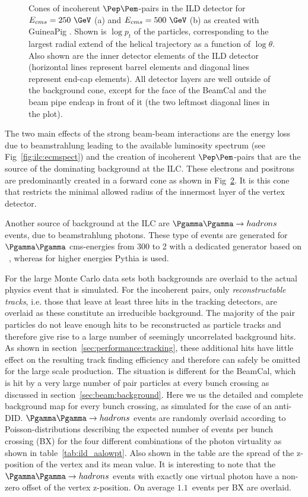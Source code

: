 \begin{figure}[h!]
\begin{subfigure}{0.49\hsize}
    \caption{ \label{fig:pair_bg_cone_500}}
  \end{subfigure}
\caption{\label{fig:pair_bg_cone} Cones of incoherent $\Pep\Pem$-pairs in the ILD detector for $E_{cms}=250~\GeV$ (a) and $E_{cms}=500~\GeV$ (b)
  as created with GuineaPig . Shown is $\log{p_t}$ of the particles,
  corresponding to the largest radial extend of the helical trajectory as a function of $\log{\theta}$.
  Also shown are the inner detector elements of the ILD detector (horizontal lines represent
  barrel elements and diagonal lines represent end-cap elements). All detector layers are well outside of the background cone,
  except for the face of the BeamCal and the beam pipe endcap in front of it (the two leftmost diagonal lines in the plot).}
\end{figure}
The two main effects of the strong beam-beam interactions are the energy loss due to
beamstrahlung leading to the available luminosity spectrum (see Fig~\ref{fig:ilc:ecmspect}) and the creation of
incoherent $\Pep\Pem$-pairs that are the source of the dominating background at the ILC.
These electrons and positrons are predominantly created in a forward cone as shown in Fig~\ref{fig:pair_bg_cone}.
It is this cone that restricts the minimal allowed radius of the innermost layer of the vertex detector.

Another source of background at the ILC are $\Pgamma \Pgamma \to hadrons$ events, due to beamstrahlung photons.
These type of events are generated for $\Pgamma \Pgamma$ cms-energies from \unit{300}{\MeV} to \unit{2}{\GeV} with a dedicated generator based
on ~\cite{Chen:1993dba}, whereas for higher energies Pythia is used.


For the large Monte Carlo data sets both backgrounds are overlaid to the actual physics event that is simulated. For the incoherent pairs, only
\emph{reconstructable tracks}, i.e. those that leave at least three hits in the tracking detectors, are overlaid as these constitute an irreducible
background. The majority of the pair particles do not leave enough hits to be reconstructed as particle tracks and therefore give rise to a
large number of seemingly uncorrelated background hits. As shown in section~\ref{sec:performance:tracking}, these additional hits have little
effect on the resulting track finding efficiency and therefore can safely be omitted for the large scale production.
The situation is different for the BeamCal, which is hit by a very large number of pair particles at every bunch crossing as discussed in
section~\ref{sec:beam:background}. Here we us the detailed and complete background map for every bunch crossing, as simulated for the
case of an anti-DID.
$\Pgamma \Pgamma \to hadrons$ events are randomly overlaid according to Poisson-distributions describing the expected number of events per bunch
crossing (BX) for the four different combinations of the photon virtuality as shown in table~\ref{tab:ild_aalowpt}. Also shown in the table are
the spread of the z-position of the vertex and its mean value. It is interesting to note that the $\Pgamma \Pgamma \to hadrons$ events with exactly
one virtual photon have a non-zero offset of the vertex z-position. On average $1.1$~events per BX are overlaid.

